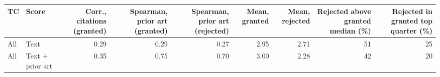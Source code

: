 \begin{tabular}{llrrrrrrr}
\toprule
TC & Score & Corr., citations (granted) & Spearman, prior art (granted) & Spearman, prior art (rejected) & Mean, granted & Mean, rejected & Rejected above granted median (\%) & Rejected in granted top quarter (\%) \\
\midrule
All & Text & 0.29 & 0.29 & 0.27 & 2.95 & 2.71 & 51 & 25 \\
All & Text + prior art & 0.35 & 0.75 & 0.70 & 3.00 & 2.28 & 42 & 20 \\
\bottomrule
\end{tabular}
